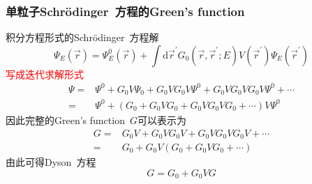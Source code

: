 \documentclass[cjk,slidestop,compress,mathserif,blue]{beamer}
\begin{document}
\frame
{
	\frametitle{单粒子\textrm{Schr\"odinger~}方程的\textrm{Green's function}}
	积分方程形式的\textrm{Schr\"odinger~}方程解
	\begin{displaymath}
		\Psi_E(\vec r)=\Psi_E^0(\vec r)+\int\mathrm{d}\vec r^{\prime}G_0(\vec r,\vec r^{\prime};E)V(\vec r^{\prime})\Psi_E(\vec r^{\prime})
	\end{displaymath}
	\textcolor{red}{写成迭代求解形式}
	\begin{displaymath}
		\begin{aligned}
			\Psi=&\Psi^0+G_0V\Psi_0+G_0VG_0V\Psi^0+G_0VG_0VG_0V\Psi^0+\cdots\\
			=&\Psi^0+(G_0+G_0VG_0+G_0VG_0VG_0+\cdots)V\Psi^0
		\end{aligned}
	\end{displaymath}
	因此完整的\textrm{Green's function~}$G$可以表示为
	\begin{displaymath}
		\begin{aligned}
			G=&G_0V+G_0VG_0V+G_0VG_0VG_0V+\cdots\\
			=&G_0+G_0V(G_0+G_0VG_0+\cdots)
		\end{aligned}
	\end{displaymath}
	由此可得\textrm{Dyson~}方程
	\begin{displaymath}
		G=G_0+G_0VG
	\end{displaymath}
}
\end{document}
